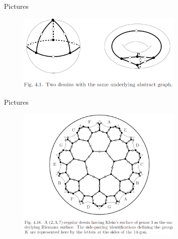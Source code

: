 \documentclass[pdf]{beamer}
\numberwithin{equation}{section}
\theoremstyle{plain}
\theoremstyle{plain}
\theoremstyle{remark}
\begin{document}
\begin{frame}[fragile]{Pictures}
	\begin{figure}[th]
	\begin{minipage}[b]{\textwidth}
		\centering
		\includegraphics[width=0.72\textwidth]{figures/Fig4-1.png}
	\end{minipage}
\end{figure}

\end{frame}
\begin{frame}[fragile]{Pictures}
\begin{figure}[th]
	\begin{minipage}[b]{\textwidth}
		\centering
		\includegraphics[width=0.72\textwidth]{figures/Fig4-16.png}
	\end{minipage}
\end{figure}
\end{frame}
\end{document}
